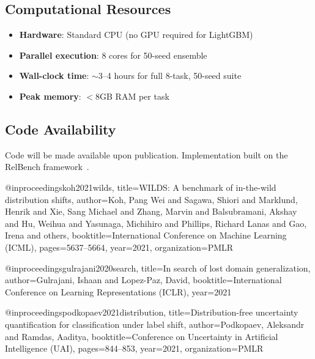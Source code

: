 \subsection{Computational Resources}

\begin{itemize}
    \item \textbf{Hardware}: Standard CPU (no GPU required for LightGBM)
    \item \textbf{Parallel execution}: 8 cores for 50-seed ensemble
    \item \textbf{Wall-clock time}: $\sim$3--4 hours for full 8-task, 50-seed suite
    \item \textbf{Peak memory}: $<$8GB RAM per task
\end{itemize}

\subsection{Code Availability}

Code will be made available upon publication. Implementation built on the
RelBench framework~\cite{fey2023relbench}.



@inproceedings{koh2021wilds,
  title={{WILDS}: A benchmark of in-the-wild distribution shifts},
  author={Koh, Pang Wei and Sagawa, Shiori and Marklund, Henrik and Xie, Sang Michael and Zhang, Marvin and Balsubramani, Akshay and Hu, Weihua and Yasunaga, Michihiro and Phillips, Richard Lanas and Gao, Irena and others},
  booktitle={International Conference on Machine Learning (ICML)},
  pages={5637--5664},
  year={2021},
  organization={PMLR}
}

@inproceedings{gulrajani2020search,
  title={In search of lost domain generalization},
  author={Gulrajani, Ishaan and Lopez-Paz, David},
  booktitle={International Conference on Learning Representations (ICLR)},
  year={2021}
}

@inproceedings{podkopaev2021distribution,
  title={Distribution-free uncertainty quantification for classification under label shift},
  author={Podkopaev, Aleksandr and Ramdas, Aaditya},
  booktitle={Conference on Uncertainty in Artificial Intelligence (UAI)},
  pages={844--853},
  year={2021},
  organization={PMLR}
}

